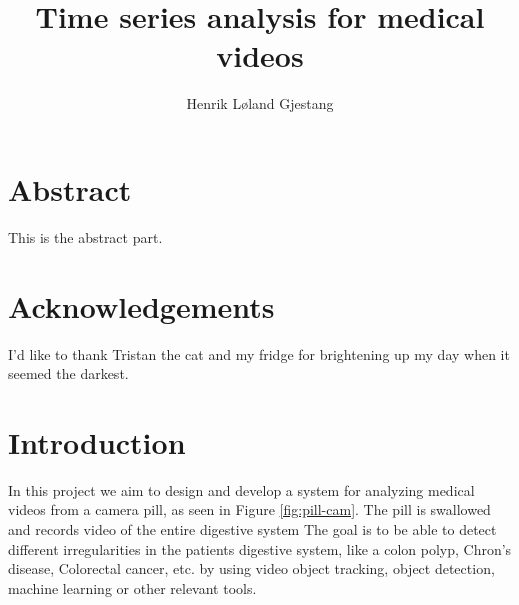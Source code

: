 \documentclass[english, a4paper]{article}
\title{Time series analysis for medical videos}
\author{Henrik Løland Gjestang}
\begin{document}
\duoforside[program={Computational Science},
  dept={Department of Informatics},
  option={Imaging and Biomedical Computing},
  long]


\section*{Abstract}
This is the abstract part.
\clearpage

\section*{Acknowledgements}
I'd like to thank Tristan the cat and my fridge for brightening up my day when it seemed the darkest.
\clearpage


\tableofcontents \clearpage
{}
\listoffigures \clearpage
{}
\listoftables \clearpage





\section{Introduction}


In this project we aim to design and develop a system for analyzing medical videos from a camera pill, as seen in Figure \ref{fig:pill-cam}. The pill is swallowed and records video of the entire digestive system The goal is to be able to detect different irregularities in the patients digestive system, like a colon polyp, Chron's disease, Colorectal cancer, etc. by using video object tracking, object detection, machine learning or other relevant tools.
\end{document}
